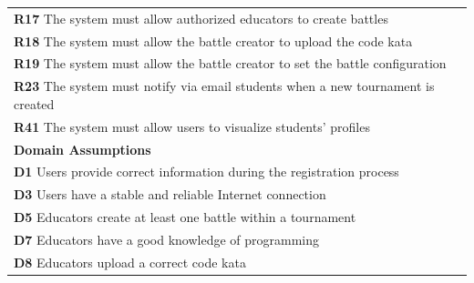\begin{table}[H]
\begin{tabularx}{\textwidth}{X}
        \textbf{R17} The system must allow authorized educators to create battles        \\ 
        \textbf{R18} The system must allow the battle creator to upload the code kata       \\
        \textbf{R19} The system must allow the battle creator to set the battle configuration       \\ 
        \textbf{R23} The system must notify via email students when a new tournament is created            \\
        \textbf{R41} The system must allow users to visualize students' profiles     \\
        \midrule
        \textbf{Domain Assumptions}                                                                                                  \\ \midrule
        \textbf{D1} Users provide correct information during the registration process \\   
        \textbf{D3} Users have a stable and reliable Internet connection \\
        \textbf{D5} Educators create at least one battle within a tournament        \\
        \textbf{D7} Educators have a good knowledge of programming      \\
        \textbf{D8} Educators upload a correct code kata        \\
        \bottomrule
    \end{tabularx}
\end{table}

